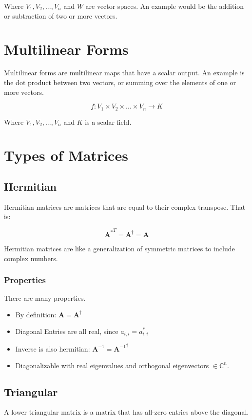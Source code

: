 Where $V_1, V_2, ... , V_n$ and $W$ are vector spaces. An example would be the addition or subtraction of two or more vectors.

\section{Multilinear Forms}
Multilinear forms are multilinear maps that have a scalar output. An example is the dot product between two vectors, or summing over the elements of one or more vectors.

\begin{equation}
f: V_1 \times V_2 \times ... \times V_n \rightarrow K
\end{equation}

Where $V_1, V_2, ... , V_n$ and $K$ is a scalar field.


\section{Types of Matrices}

\subsection{Hermitian}
Hermitian matrices are matrices that are equal to their complex transpose. That is:

\begin{equation}
{\mathbf{A}^{*}}^T = \mathbf{A}^\dagger = \mathbf{A} 
\end{equation}

Hermitian matrices are like a generalization of symmetric matrices to include complex numbers. 

\subsubsection{Properties}
There are many properties. 
\begin{itemize}
\item By definition: $\mathbf{A} = \mathbf{A}^\dagger$
\item Diagonal Entries are all real, since $a_{i,i} = a_{i,i}^*$
\item Inverse is also hermitian:  $\mathbf{A}^{-1} ={ \mathbf{A}^{-1}}^\dagger$
\item Diagonalizable with real eigenvalues and orthogonal eigenvectors $\in \mathbb{C}^n$.
\end{itemize}


\subsection{Triangular}
A lower triangular matrix is a matrix that has all-zero entries above the diagonal.

